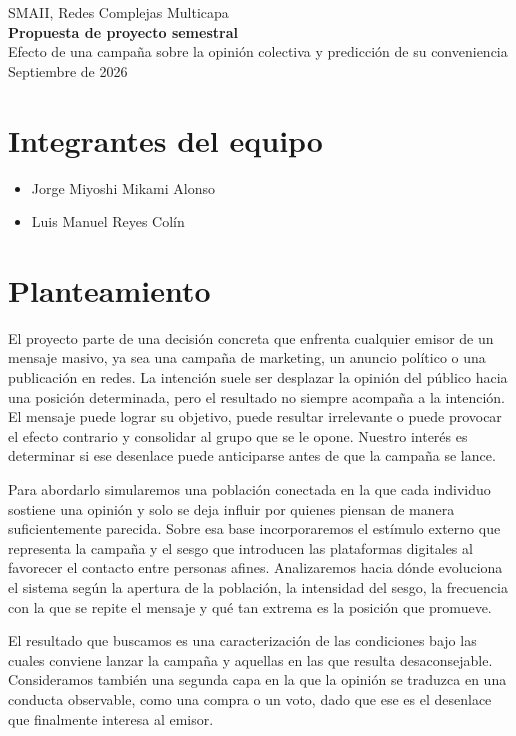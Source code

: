 \documentclass[11pt]{article}
\begin{document}
\begin{center}
	{\small SMAII, Redes Complejas Multicapa}\\[6pt]
	{\Large\bfseries Propuesta de proyecto semestral}\\[3pt]
	{\normalsize Efecto de una campaña sobre la opinión colectiva y predicción de su conveniencia}\\[4pt]
	{\small Septiembre de 2026}
\end{center}

\section*{Integrantes del equipo}
\begin{itemize}
    \item Jorge Miyoshi Mikami Alonso
    \item Luis Manuel Reyes Colín 
\end{itemize}

\section*{Planteamiento}

El proyecto parte de una decisión concreta que enfrenta cualquier emisor de un mensaje
masivo, ya sea una campaña de marketing, un anuncio político o una publicación en redes.
La intención suele ser desplazar la opinión del público hacia una posición determinada,
pero el resultado no siempre acompaña a la intención. El mensaje puede lograr su objetivo,
puede resultar irrelevante o puede provocar el efecto contrario y consolidar al grupo que
se le opone. Nuestro interés es determinar si ese desenlace puede anticiparse antes de
que la campaña se lance.

Para abordarlo simularemos una población conectada en la que cada individuo sostiene una
opinión y solo se deja influir por quienes piensan de manera suficientemente parecida.
Sobre esa base incorporaremos el estímulo externo que representa la campaña y el sesgo
que introducen las plataformas digitales al favorecer el contacto entre personas
afines. Analizaremos hacia dónde evoluciona el sistema según la apertura de la población,
la intensidad del sesgo, la frecuencia con la que se repite el mensaje y qué tan extrema
es la posición que promueve.

El resultado que buscamos es una caracterización de las condiciones bajo las cuales
conviene lanzar la campaña y aquellas en las que resulta desaconsejable. Consideramos
también una segunda capa en la que la opinión se traduzca en una conducta observable,
como una compra o un voto, dado que ese es el desenlace que finalmente interesa al emisor.
\end{document}
